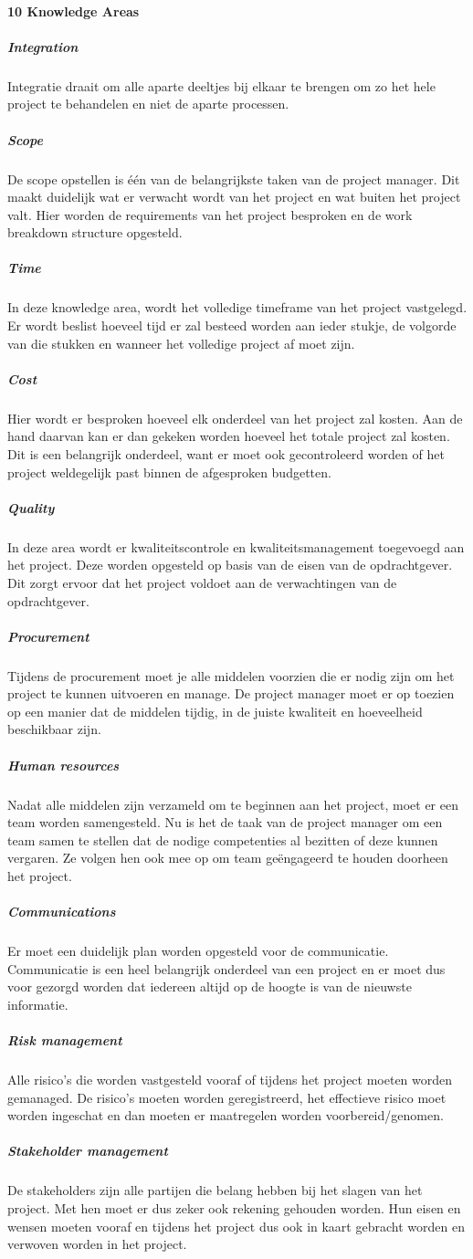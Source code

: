 \documentclass[]{article}
\begin{document}
\paragraph{10 Knowledge Areas}
\subparagraph{Integration}
Integratie draait om alle aparte deeltjes bij elkaar te brengen om zo het hele project te behandelen en niet de aparte processen.
\subparagraph{Scope}
De scope opstellen is één van de belangrijkste taken van de project manager. Dit maakt duidelijk wat er verwacht wordt van het project en wat buiten het project valt. Hier worden de requirements van het project besproken en de work breakdown structure opgesteld.
\subparagraph{Time}
In deze knowledge area, wordt het volledige timeframe van het project vastgelegd. Er wordt beslist hoeveel tijd er zal besteed worden aan ieder stukje, de volgorde van die stukken en wanneer het volledige project af moet zijn.
\subparagraph{Cost}
Hier wordt er besproken hoeveel elk onderdeel van het project zal kosten. Aan de hand daarvan kan er dan gekeken worden hoeveel het totale project zal kosten. Dit is een belangrijk onderdeel, want er moet ook gecontroleerd worden of het project weldegelijk past binnen de afgesproken budgetten.
\subparagraph{Quality}
In deze area wordt er kwaliteitscontrole en kwaliteitsmanagement toegevoegd aan het project. Deze worden opgesteld op basis van de eisen van de opdrachtgever. Dit zorgt ervoor dat het project voldoet aan de verwachtingen van de opdrachtgever.
\subparagraph{Procurement}
Tijdens de procurement moet je alle middelen voorzien die er nodig zijn om het project te kunnen uitvoeren en manage. De project manager moet er op toezien op een manier dat de middelen tijdig, in de juiste kwaliteit en hoeveelheid beschikbaar zijn.
\subparagraph{Human resources}
Nadat alle middelen zijn verzameld om te beginnen aan het project, moet er een team worden samengesteld. Nu is het de taak van de project manager om een team samen te stellen dat de nodige competenties al bezitten of deze kunnen vergaren. Ze volgen hen ook mee op om team geëngageerd te houden doorheen het project.
\subparagraph{Communications}
Er moet een duidelijk plan worden opgesteld voor de communicatie. Communicatie is een heel belangrijk onderdeel van een project en er moet dus voor gezorgd worden dat iedereen altijd op de hoogte is van de nieuwste informatie.
\subparagraph{Risk management}
Alle risico's die worden vastgesteld vooraf of tijdens het project moeten worden gemanaged. De risico's moeten worden geregistreerd, het effectieve risico moet worden ingeschat en dan moeten er maatregelen worden voorbereid/genomen.
\subparagraph{Stakeholder management}
De stakeholders zijn alle partijen die belang hebben bij het slagen van het project. Met hen moet er dus zeker ook rekening gehouden worden. Hun eisen en wensen moeten vooraf en tijdens het project dus ook in kaart gebracht worden en verwoven worden in het project.
\end{document}
